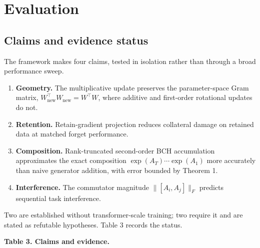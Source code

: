 \documentclass[
]{article}
\providecommand{\tightlist}{%
  \setlength{\itemsep}{0pt}\setlength{\parskip}{0pt}}
\begin{document}
\section{Evaluation}\label{evaluation}

\subsection{Claims and evidence status}\label{claims-and-evidence-status}

The framework makes four claims, tested in isolation rather than through a broad performance sweep.

\begin{enumerate}
\def\labelenumi{\arabic{enumi}.}
\tightlist
\item
  \textbf{Geometry.} The multiplicative update preserves the parameter-space Gram matrix, \(W_{\mathrm{new}}^\top W_{\mathrm{new}}=W^\top W\), where additive and first-order rotational updates do not.
\item
  \textbf{Retention.} Retain-gradient projection reduces collateral damage on retained data at matched forget performance.
\item
  \textbf{Composition.} Rank-truncated second-order BCH accumulation approximates the exact composition \(\exp(A_T)\cdots\exp(A_1)\) more accurately than naive generator addition, with error bounded by Theorem 1.
\item
  \textbf{Interference.} The commutator magnitude \(\|[A_i,A_j]\|_F\) predicts sequential task interference.
\end{enumerate}

Two are established without transformer-scale training; two require it and are stated as refutable hypotheses. Table 3 records the status.

\textbf{Table 3. Claims and evidence.}
\end{document}
